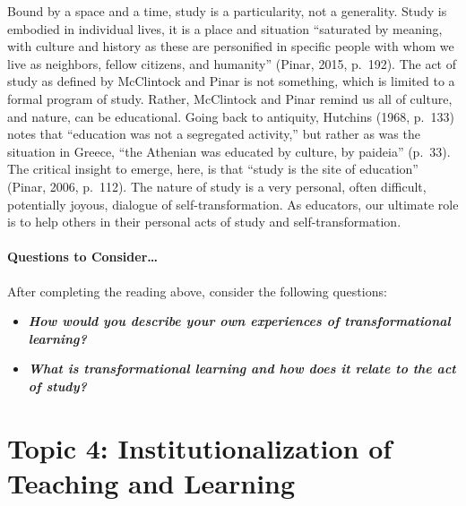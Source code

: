 \documentclass[
]{book}
\providecommand{\tightlist}{%
  \setlength{\itemsep}{0pt}\setlength{\parskip}{0pt}}
\begin{document}
Bound by a space and a time, study is a particularity, not a generality. Study is embodied in individual lives, it is a place and situation ``saturated by meaning, with culture and history as these are personified in specific people with whom we live as neighbors, fellow citizens, and humanity'' (Pinar, 2015, p.~192). The act of study as defined by McClintock and Pinar is not something, which is limited to a formal program of study. Rather, McClintock and Pinar remind us all of culture, and nature, can be educational. Going back to antiquity, Hutchins (1968, p.~133) notes that ``education was not a segregated activity,'' but rather as was the situation in Greece, ``the Athenian was educated by culture, by paideia'' (p.~33). The critical insight to emerge, here, is that ``study is the site of education'' (Pinar, 2006, p.~112). The nature of study is a very personal, often difficult, potentially joyous, dialogue of self-transformation. As educators, our ultimate role is to help others in their personal acts of study and self-transformation.

\begin{reflect}
\hypertarget{questions-to-consider}{%
\paragraph*{Questions to Consider\ldots{}}\label{questions-to-consider}}

After completing the reading above, consider the following questions:

\begin{itemize}
\tightlist
\item
  \textbf{\emph{How would you describe your own experiences of
  transformational learning?}}
\item
  \textbf{\emph{What is transformational learning and how does it relate
  to the act of study?}}
\end{itemize}
\end{reflect}

\hypertarget{topic-4-institutionalization-of-teaching-and-learning}{%
\section*{Topic 4: Institutionalization of Teaching and Learning}\label{topic-4-institutionalization-of-teaching-and-learning}}
\end{document}
